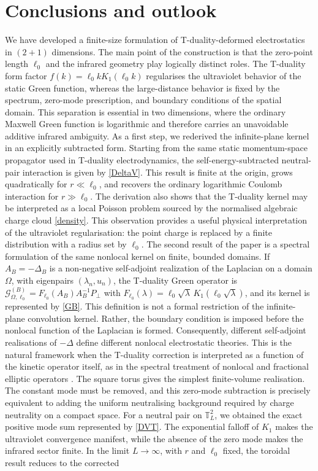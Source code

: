 \documentclass[openacc]{rsproca_new}%
\begin{document}
\section{Conclusions and outlook}
\label{sec:conclusions}

We have developed a finite-size formulation of T-duality-deformed electrostatics in $(2+1)$ dimensions. The main point of the construction is that the zero-point length $\ell_0$ and the infrared geometry play logically distinct roles. The T-duality form factor $f(k)=\ell_0 kK_1(\ell_0 k)$ regularises the ultraviolet behavior of the static Green function, whereas the large-distance behavior is fixed by the spectrum, zero-mode prescription, and boundary conditions of the spatial domain. This separation is essential in two dimensions, where the ordinary Maxwell Green function is logarithmic and therefore carries an unavoidable additive infrared ambiguity. As a first step, we rederived the infinite-plane kernel in an explicitly subtracted form. Starting from the same static momentum-space propagator used in T-duality electrodynamics, the self-energy-subtracted neutral-pair interaction is given by \eqref{DeltaV}. This result is finite at the origin, grows quadratically for $r\ll\ell_0$, and recovers the ordinary logarithmic Coulomb interaction for $r\gg\ell_0$. The derivation also shows that the T-duality kernel may be interpreted as a local Poisson problem sourced by the normalised algebraic charge cloud \eqref{density}. This observation provides a useful physical interpretation of the ultraviolet regularisation: the point charge is replaced by a finite distribution with a radius set by $\ell_0$. The second result of the paper is a spectral formulation of the same nonlocal kernel on finite, bounded domains. If $A_B=-\Delta_B$ is a non-negative self-adjoint realization of the Laplacian on a domain $\Omega$, with eigenpairs $(\lambda_n,u_n)$, the T-duality Green operator is $\mathcal G_{\Omega,\ell_0}^{(B)}=F_{\ell_0}(A_B)A_B^{-1}P_\perp$ with $F_{\ell_0}(\lambda)=\ell_0\sqrt{\lambda}\, K_1(\ell_0\sqrt{\lambda})$, and its kernel is represented by \eqref{GB}. This definition is not a formal restriction of the infinite-plane convolution kernel. Rather, the boundary condition is imposed before the nonlocal function of the Laplacian is formed. Consequently, different self-adjoint realisations of $-\Delta$ define different nonlocal electrostatic theories. This is the natural framework when the T-duality correction is interpreted as a function of the kinetic operator itself, as in the spectral treatment of nonlocal and fractional elliptic operators \cite{Seeley1967, Grubb2015, Kwasnicki2017, BonitoPasciak2015}. The square torus gives the simplest finite-volume realisation. The constant mode must be removed, and this zero-mode subtraction is precisely equivalent to adding the uniform neutralising background required by charge neutrality on a compact space. For a neutral pair on $\mathbb T_L^2$, we obtained the exact positive mode sum represented by \eqref{DVT}. The exponential falloff of $K_1$ makes the ultraviolet convergence manifest, while the absence of the zero mode makes the infrared sector finite. In the limit $L\to\infty$, with $r$ and $\ell_0$ fixed, the toroidal result reduces to the corrected 
\end{document}
